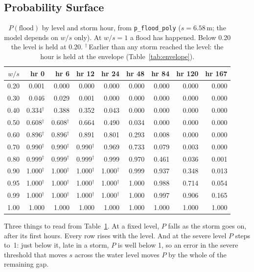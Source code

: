 \documentclass[11pt,a4paper]{article}
\begin{document}
\subsection{Probability Surface}
\begin{table}[ht]\centering\small\begin{tabular}{r|rrrrrrrr}
$w/s$ & hr 0 & hr 6 & hr 12 & hr 24 & hr 48 & hr 84 & hr 120 & hr 167 \\ \hline
0.20 & 0.001 & 0.000 & 0.000 & 0.000 & 0.000 & 0.000 & 0.000 & 0.000 \\
0.30 & 0.046 & 0.029 & 0.001 & 0.000 & 0.000 & 0.000 & 0.000 & 0.000 \\
0.40 & 0.334$^\dagger$ & 0.388 & 0.352 & 0.043 & 0.000 & 0.000 & 0.000 & 0.000 \\
0.50 & 0.608$^\dagger$ & 0.608$^\dagger$ & 0.664 & 0.490 & 0.034 & 0.000 & 0.000 & 0.000 \\
0.60 & 0.896$^\dagger$ & 0.896$^\dagger$ & 0.891 & 0.801 & 0.293 & 0.008 & 0.000 & 0.000 \\
0.70 & 0.990$^\dagger$ & 0.990$^\dagger$ & 0.990$^\dagger$ & 0.969 & 0.733 & 0.079 & 0.003 & 0.000 \\
0.80 & 0.999$^\dagger$ & 0.999$^\dagger$ & 0.999$^\dagger$ & 0.999 & 0.970 & 0.461 & 0.036 & 0.001 \\
0.90 & 1.000$^\dagger$ & 1.000$^\dagger$ & 1.000$^\dagger$ & 1.000$^\dagger$ & 0.999 & 0.937 & 0.348 & 0.013 \\
0.95 & 1.000$^\dagger$ & 1.000$^\dagger$ & 1.000$^\dagger$ & 1.000$^\dagger$ & 1.000 & 0.988 & 0.714 & 0.054 \\
0.99 & 1.000$^\dagger$ & 1.000$^\dagger$ & 1.000$^\dagger$ & 1.000$^\dagger$ & 1.000 & 0.997 & 0.906 & 0.165 \\
1.00 & 1.000 & 1.000 & 1.000 & 1.000 & 1.000 & 1.000 & 1.000 & 1.000 \\
\end{tabular}\caption{$P(\mathrm{flood})$ by level and storm hour, from \texttt{p\_flood\_poly} ($s=6.58$\,m; the model depends on $w/s$ only). At $w/s=1$ a flood has happened. Below 0.20 the level is held at 0.20. $^\dagger$\,Earlier than any storm reached the level: the hour is held at the envelope (Table~\ref{tab:envelope}).}\label{tab:grid}\end{table}

Three things to read from Table~\ref{tab:grid}. At a fixed level, $P$ falls as the
storm goes on, after its first hours. Every row rises with the level. And at the severe level $P$ steps to~1:
just below it, late in a storm, $P$ is well below 1, so an error in the severe
threshold that moves $s$ across the water level moves $P$ by the whole of the
remaining gap.
\end{document}
